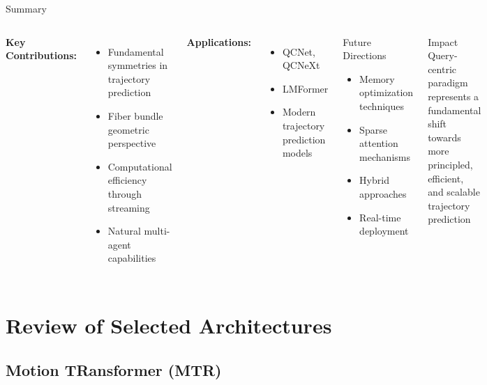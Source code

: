 \documentclass[10pt,aspectratio=169]{beamer}
\begin{document}
\begin{frame}{Summary}
\begin{columns}[T]
\textbf{Key Contributions:}
\begin{itemize}
    \item Fundamental symmetries in trajectory prediction
    \item Fiber bundle geometric perspective
    \item Computational efficiency through streaming
    \item Natural multi-agent capabilities
\end{itemize}

\textbf{Applications:}
\begin{itemize}
    \item QCNet, QCNeXt
    \item LMFormer
    \item Modern trajectory prediction models
\end{itemize}

\begin{block}{Future Directions}
\begin{itemize}
    \item Memory optimization techniques
    \item Sparse attention mechanisms
    \item Hybrid approaches
    \item Real-time deployment
\end{itemize}
\end{block}

\begin{alertblock}{Impact}
Query-centric paradigm represents a fundamental shift towards more principled, efficient, and scalable trajectory prediction
\end{alertblock}
\end{columns}
\end{frame}


\section{Review of Selected Architectures}


\subsection{Motion TRansformer (MTR)}
\end{document}
